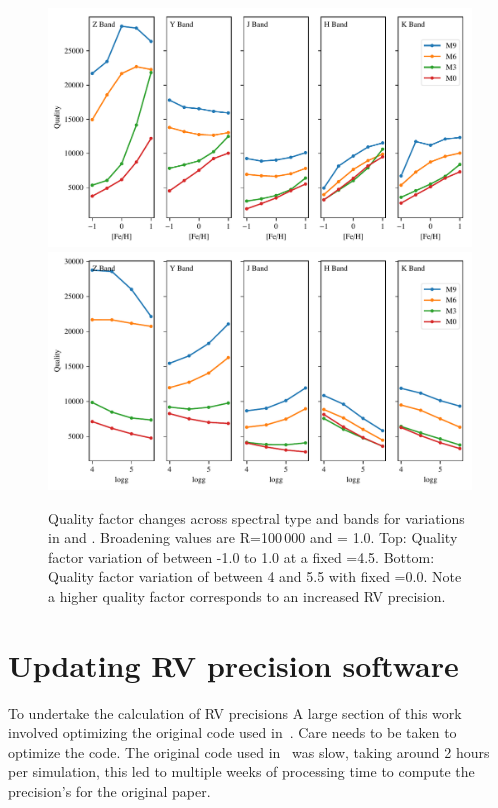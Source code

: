 \begin{figure}
\includegraphics[width=0.99\linewidth]{figures/information-content/metalicity_effect.pdf}\\
\includegraphics[width=0.99\linewidth]{figures/information-content/logg_effect.pdf}
\caption[Quality factor verse \feh{} and \logg{} for different spectral types and wavelength bands.]{Quality factor changes across spectral type and bands for variations in \feh{} and \logg{}.
Broadening values are R=100\,000 and \Vsini{} = 1.0\kmps{}.
Top: Quality factor variation of \feh{} between -1.0 to 1.0 at a fixed \logg{}=4.5.
Bottom: Quality factor variation of \logg{} between 4 and 5.5 with fixed \feh{}=0.0.
Note a higher quality factor corresponds to an increased {RV} precision.}
\label{fig:deviations}
\end{figure}


\clearpage

\section{Updating {RV} precision software}
To undertake the calculation of RV precisions
A large section of this work involved optimizing the original code used in~\citet{figueira_radial_2016}.
Care needs to be taken to optimize the code.
The original code used in~\citet{figueira_radial_2016} was slow, taking around 2 hours per simulation, this led to multiple weeks of processing time to compute the precision's for the original paper.

